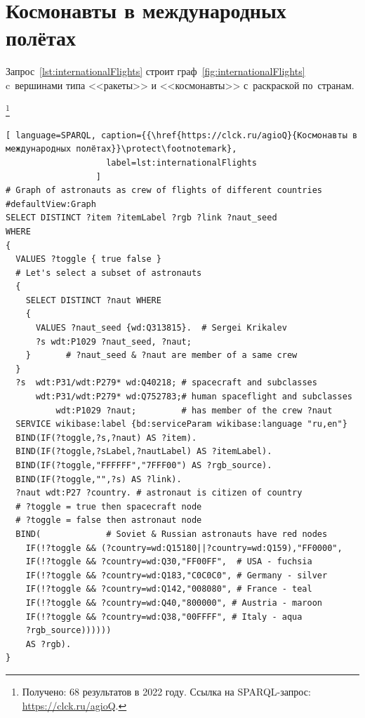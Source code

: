 \section{Космонавты в международных полётах}

Запрос~\ref{lst:internationalFlights} строит граф~\ref{fig:internationalFlights} 
c~вершинами типа <<ракеты>> и <<космонавты>> с~раскраской по~странам.


\footnote[17][2\baselineskip]{Получено: 68 результатов в 2022 году. Ссылка на SPARQL-запрос: \href{https://clck.ru/agioQ}{https://clck.ru/agioQ}.}
\begin{lstlisting}[ language=SPARQL, caption={{\href{https://clck.ru/agioQ}{Космонавты в международных полётах}}\protect\footnotemark}, 
                    label=lst:internationalFlights
                  ]
# Graph of astronauts as crew of flights of different countries
#defaultView:Graph
SELECT DISTINCT ?item ?itemLabel ?rgb ?link ?naut_seed
WHERE
{ 
  VALUES ?toggle { true false }
  # Let's select a subset of astronauts
  {
    SELECT DISTINCT ?naut WHERE
    { 
      VALUES ?naut_seed {wd:Q313815}.  # Sergei Krikalev
      ?s wdt:P1029 ?naut_seed, ?naut;  
    }       # ?naut_seed & ?naut are member of a same crew
  }
  ?s  wdt:P31/wdt:P279* wd:Q40218; # spacecraft and subclasses
      wdt:P31/wdt:P279* wd:Q752783;# human spaceflight and subclasses
          wdt:P1029 ?naut;         # has member of the crew ?naut    
  SERVICE wikibase:label {bd:serviceParam wikibase:language "ru,en"}
  BIND(IF(?toggle,?s,?naut) AS ?item).
  BIND(IF(?toggle,?sLabel,?nautLabel) AS ?itemLabel).
  BIND(IF(?toggle,"FFFFFF","7FFF00") AS ?rgb_source).
  BIND(IF(?toggle,"",?s) AS ?link).
  ?naut wdt:P27 ?country. # astronaut is citizen of country 
  # ?toggle = true then spacecraft node
  # ?toggle = false then astronaut node
  BIND(             # Soviet & Russian astronauts have red nodes
    IF(!?toggle && (?country=wd:Q15180||?country=wd:Q159),"FF0000",
    IF(!?toggle && ?country=wd:Q30,"FF00FF",  # USA - fuchsia
    IF(!?toggle && ?country=wd:Q183,"C0C0C0", # Germany - silver
    IF(!?toggle && ?country=wd:Q142,"008080", # France - teal
    IF(!?toggle && ?country=wd:Q40,"800000", # Austria - maroon
    IF(!?toggle && ?country=wd:Q38,"00FFFF", # Italy - aqua
    ?rgb_source))))))
    AS ?rgb).
}
\end{lstlisting}

